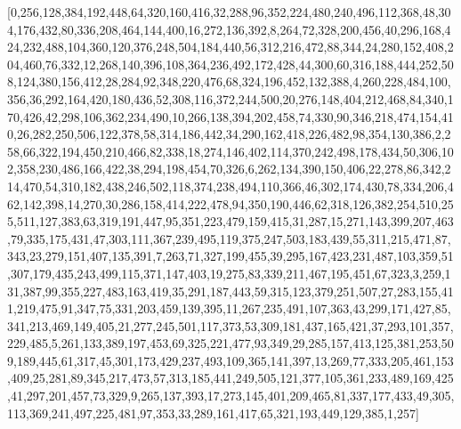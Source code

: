 [0,256,128,384,192,448,64,320,160,416,32,288,96,352,224,480,240,496,112,368,48,304,176,432,80,336,208,464,144,400,16,272,136,392,8,264,72,328,200,456,40,296,168,424,232,488,104,360,120,376,248,504,184,440,56,312,216,472,88,344,24,280,152,408,204,460,76,332,12,268,140,396,108,364,236,492,172,428,44,300,60,316,188,444,252,508,124,380,156,412,28,284,92,348,220,476,68,324,196,452,132,388,4,260,228,484,100,356,36,292,164,420,180,436,52,308,116,372,244,500,20,276,148,404,212,468,84,340,170,426,42,298,106,362,234,490,10,266,138,394,202,458,74,330,90,346,218,474,154,410,26,282,250,506,122,378,58,314,186,442,34,290,162,418,226,482,98,354,130,386,2,258,66,322,194,450,210,466,82,338,18,274,146,402,114,370,242,498,178,434,50,306,102,358,230,486,166,422,38,294,198,454,70,326,6,262,134,390,150,406,22,278,86,342,214,470,54,310,182,438,246,502,118,374,238,494,110,366,46,302,174,430,78,334,206,462,142,398,14,270,30,286,158,414,222,478,94,350,190,446,62,318,126,382,254,510,255,511,127,383,63,319,191,447,95,351,223,479,159,415,31,287,15,271,143,399,207,463,79,335,175,431,47,303,111,367,239,495,119,375,247,503,183,439,55,311,215,471,87,343,23,279,151,407,135,391,7,263,71,327,199,455,39,295,167,423,231,487,103,359,51,307,179,435,243,499,115,371,147,403,19,275,83,339,211,467,195,451,67,323,3,259,131,387,99,355,227,483,163,419,35,291,187,443,59,315,123,379,251,507,27,283,155,411,219,475,91,347,75,331,203,459,139,395,11,267,235,491,107,363,43,299,171,427,85,341,213,469,149,405,21,277,245,501,117,373,53,309,181,437,165,421,37,293,101,357,229,485,5,261,133,389,197,453,69,325,221,477,93,349,29,285,157,413,125,381,253,509,189,445,61,317,45,301,173,429,237,493,109,365,141,397,13,269,77,333,205,461,153,409,25,281,89,345,217,473,57,313,185,441,249,505,121,377,105,361,233,489,169,425,41,297,201,457,73,329,9,265,137,393,17,273,145,401,209,465,81,337,177,433,49,305,113,369,241,497,225,481,97,353,33,289,161,417,65,321,193,449,129,385,1,257]

